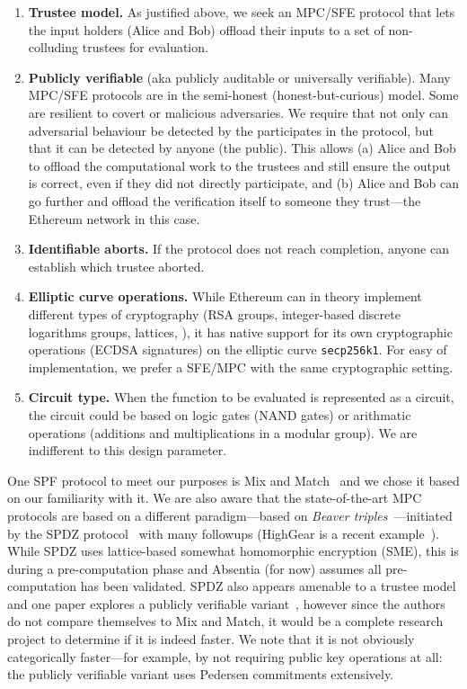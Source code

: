 \begin{enumerate}
\item \textbf{Trustee model.} As justified above, we seek an MPC/SFE protocol that lets the input holders (\eg Alice and Bob) offload their inputs to a set of non-colluding trustees for evaluation. 
\item \textbf{Publicly verifiable} (aka publicly auditable or universally verifiable). Many MPC/SFE protocols are in the semi-honest (\ie honest-but-curious) model. Some are resilient to covert or malicious adversaries. We require that not only can adversarial behaviour  be detected by the participates in the protocol, but that it can be detected by anyone (\ie the public). This allows (a) Alice and Bob to offload the computational work to the trustees and still ensure the output is correct, even if they did not directly participate, and (b) Alice and Bob can go further and offload the verification itself to someone they trust---the Ethereum network in this case.
\item \textbf{Identifiable aborts.} If the protocol does not reach completion, anyone can establish which trustee aborted.
\item \textbf{Elliptic curve operations.} While Ethereum can in theory implement different types of cryptography (RSA groups, integer-based discrete logarithms groups, lattices, \etc), it has native support for its own cryptographic operations (ECDSA signatures) on the elliptic curve \texttt{secp256k1}. For easy of implementation, we prefer a SFE/MPC with the same cryptographic setting. 
\item \textbf{Circuit type.} When the function to be evaluated is represented as a circuit, the circuit could be based on logic gates (\ie NAND gates) or arithmatic operations (\eg additions and multiplications in a modular group). We are indifferent to this design parameter.
\end{enumerate}

One SPF protocol to meet our purposes is Mix and Match~\cite{JJ00} and we chose it based on our familiarity with it. We are also aware that the state-of-the-art MPC protocols are based on a different paradigm---based on \emph{Beaver triples}~\cite{beaver1997commodity}---initiated by the SPDZ protocol~\cite{damgaard2012multiparty,damgaard2013practical} with many followups (HighGear is a recent example~\cite{keller2018overdrive}). While SPDZ uses lattice-based somewhat homomorphic encryption (SME), this is during a pre-computation phase and Absentia (for now) assumes all pre-computation has been validated. SPDZ also appears amenable to a trustee model and one paper explores a publicly verifiable variant~\cite{baum2014publicly}, however since the authors do not compare themselves to Mix and Match, it would be a complete research project to determine if it is indeed faster. We note that it is not obviously categorically faster---for example, by not requiring public key operations at all: the publicly verifiable variant uses Pedersen commitments extensively.  

